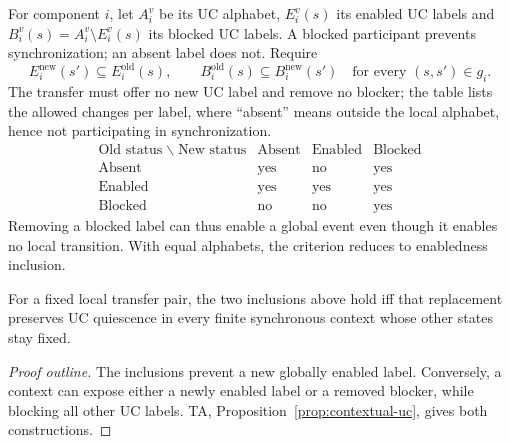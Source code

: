 \documentclass[acmsmall,screen,review,anonymous]{acmart}
\begin{document}
For component $i$, let $A_i^v$ be its UC alphabet, $E_i^v(s)$ its enabled UC labels and $B_i^v(s)=A_i^v\setminus E_i^v(s)$ its blocked UC labels. A blocked participant prevents synchronization; an absent label does not. Require
\[
 E_i^{\mathrm{new}}(s')\subseteq E_i^{\mathrm{old}}(s),\qquad
 B_i^{\mathrm{old}}(s)\subseteq B_i^{\mathrm{new}}(s')
 \quad\text{for every }(s,s')\in g_i.
\]
The transfer must offer no new UC label and remove no blocker; the table lists the allowed changes per label, where ``absent'' means outside the local alphabet, hence not participating in synchronization.
\[
\begin{array}{l|ccc}
\text{Old status}\;\backslash\;\text{New status}&\text{Absent}&\text{Enabled}&\text{Blocked}\\\hline
\text{Absent}&\text{yes}&\text{no}&\text{yes}\\
\text{Enabled}&\text{yes}&\text{yes}&\text{yes}\\
\text{Blocked}&\text{no}&\text{no}&\text{yes}
\end{array}
\]
Removing a blocked label can thus enable a global event even though it enables no local transition. With equal alphabets, the criterion reduces to enabledness inclusion.
\begin{proposition}\label{prop:local-uc-main}
For a fixed local transfer pair, the two inclusions above hold iff that replacement preserves UC quiescence in every finite synchronous context whose other states stay fixed.
\end{proposition}
\begin{proof}[Proof outline]
The inclusions prevent a new globally enabled label. Conversely, a context can expose either a newly enabled label or a removed blocker, while blocking all other UC labels. TA, Proposition~\ref{prop:contextual-uc}, gives both constructions.
\end{proof}
\end{document}

